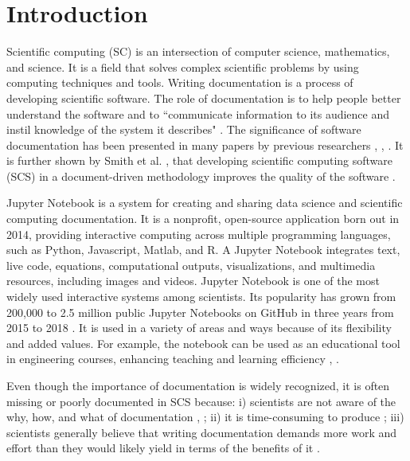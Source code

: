 \chapter{Introduction} \label{chap:intro}
Scientific computing (SC) is an intersection of computer science, mathematics, 
and science. It is a field that solves complex scientific problems by using 
computing techniques and tools. Writing documentation is a process of 
developing scientific software. The role of documentation is to help 
people better understand the software and to ``communicate information to its 
audience and instil knowledge of the system it describes" 
\cite{forward2002software}. The significance of software documentation has 
been presented in many papers by previous researchers \cite{parnas2011precise}, 
\cite{chomal2014significance}, \cite{kipyegen2013importance}. It is further 
shown by Smith et al. \cite{SmithandKoothoor2016}, \cite{SmithandYu2007} that 
developing scientific computing software (SCS) in a document-driven methodology 
improves the quality of the software . 

Jupyter Notebook is a system for creating and sharing data science and 
scientific computing documentation. It is a nonprofit, open-source application 
born out in 2014, providing interactive computing across multiple programming 
languages, such as Python, Javascript, Matlab, and R. A Jupyter Notebook 
integrates text, live code, equations, computational outputs, visualizations, 
and multimedia resources, including images and videos. Jupyter Notebook is one 
of the most widely used interactive systems among scientists. Its popularity 
has grown from 200,000 to 2.5 million public Jupyter Notebooks on GitHub in 
three years from 2015 to 2018 \cite{Jeffrey2018}. It is used in a variety of 
areas and ways because of its flexibility and added values. For example, the 
notebook can be used as an educational tool in engineering courses, enhancing 
teaching and learning efficiency \cite{cardoso2019using}, \cite{zhao2019use}.

Even though the importance of documentation is widely recognized, it is often 
missing or poorly documented in SCS because: i) scientists are not aware of 
the why, how, and what of documentation \cite{hermann2022documenting}, 
\cite{chang2022understanding}; ii) it is time-consuming to produce 
\cite{sanders2008dealing}; iii) scientists generally believe that writing 
documentation demands more work and effort than they would likely yield in 
terms of the benefits of it \cite{smith2016advantages}.

